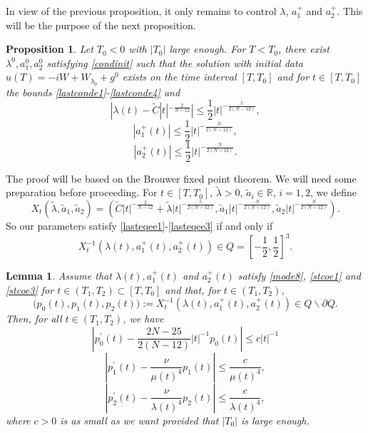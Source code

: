 \documentclass[a4paper,two-side,10pt]{amsart}
\newtheorem{prop}{Proposition}[section]
\newtheorem{lem}{Lemma}[section]
\newcommand{\R}{\mathbb{R}}
\numberwithin{equation}{section}
\begin{document}
In view of the previous proposition, it only remains to control $\lambda$, $a_1^+$ and $a_2^+$. This will be the purpose of the next proposition.
\begin{prop}
\label{Proplast}
Let $T_0<0$ with $|T_0 |$ large enough. For $T<T_0$, there exist $\lambda^0, a_1^0, a_2^0$ satisfying \eqref{condinit} such that the solution with initial data $u(T)=-iW+W_{\lambda_0}+g^0$ exists on the time interval $[T,T_0]$ and for $t\in [T,T_0]$ the bounds \eqref{lastconde1}-\eqref{lastconde4} and
\begin{equation}
\label{lasteqee1}
|\lambda (t) - \tilde{C}|t|^{-\frac{2}{N-12}}|\leq \frac{1}{2} |t|^{-\frac{5}{2(N-12)}},
\end{equation}
\begin{equation}
\label{lasteqee2}
|a_1^+ (t)|\leq \frac{1}{2} |t|^{-\frac{N}{2(N-12)}},
\end{equation}
\begin{equation}
\label{lasteqee3}
|a_2^+ (t)|\leq \frac{1}{2} |t|^{-\frac{N}{2(N-12)}}.
\end{equation}
\end{prop}

The proof will be based on the Brouwer fixed point theorem. We will need some preparation before proceeding.
For $t\in [T,T_0]$, $\tilde{\lambda} >0$, $\tilde{a}_i \in \R$, $i=1,2$, we define
$$X_t (\tilde{\lambda} , \tilde{a}_1 , \tilde{a}_2) = (\tilde{C} |t|^{-\frac{2}{N-12}} + \tilde{\lambda} |t|^{-\frac{5}{2(N-12)}}, \tilde{a}_1 |t|^{-\frac{N}{2(N-12)}}, \tilde{a}_2 |t|^{-\frac{N}{2(N-12)}} ).$$
So our parameters satisfy \eqref{lasteqee1}-\eqref{lasteqee3} if and only if
$$X^{-1}_t (\lambda (t) , a_1^+ (t) , a_2^+ (t)) \in Q =[-\frac{1}{2} , \frac{1}{2} ]^3.$$

\begin{lem}
Assume that $\lambda (t), a_1^+ (t)$ and $a_2^+ (t)$ satisfy \eqref{mode8}, \eqref{stcoe1} and \eqref{stcoe3} for $t\in (T_1 ,T_2)\subset [T,T_0]$ and that, for $t\in (T_1 ,T_2)$,
$$\big(p_0(t) ,p_1(t) ,p_2(t)\big) := X_t^{-1} (\lambda (t) , a_1^+ (t) , a_2^+ (t)) \in Q \backslash \partial Q .$$
Then, for all $t\in (T_1,T_2)$, we have
\begin{equation}
\label{blablaree1}
\left|p_0^\prime (t) - \frac{2N-25}{2(N-12)} |t|^{-1} p_0 (t)\right| \leq c |t|^{-1}
\end{equation}
\begin{equation}
\label{blablaree2}
|p_1^\prime (t) - \frac{\nu}{\mu (t)^4} p_1 (t)| \leq \frac{c}{\mu (t)^4}, 
\end{equation}
\begin{equation}
\label{blablaree3}
|p_2^\prime (t) - \frac{\nu}{\lambda (t)^4 } p_2 (t)| \leq \frac{c}{\lambda (t)^4}, 
\end{equation}
where $c>0$ is as small as we want provided that $|T_0|$ is large enough.
\end{lem}
\end{document}
